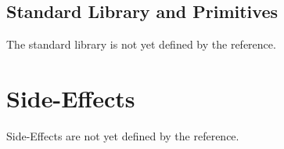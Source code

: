 




\subsection{Standard Library and Primitives}

The standard library is not yet defined by the reference.


\section{Side-Effects}

Side-Effects are not yet defined by the reference.



%
